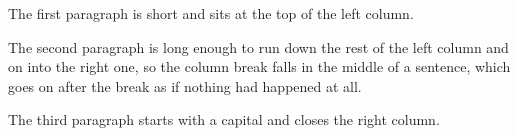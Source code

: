 \documentclass[twocolumn]{article}
\begin{document}
The first paragraph is short and sits at the top of the left column.

The second paragraph is long enough to run down the rest of the left column and on
into the right one, so the column break falls in the middle of a sentence, which goes
on after the break as if nothing had happened at all.

The third paragraph starts with a capital and closes the right column.
\end{document}
